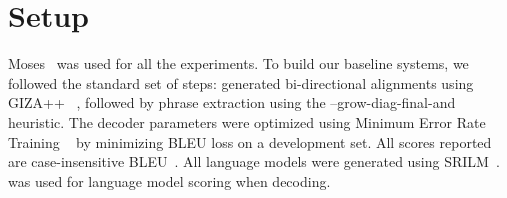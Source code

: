 \section{Setup}
\label{sec:setup}


Moses~\cite{Koehn:07} was used for all the experiments. To build our baseline systems, we followed the standard set of steps: generated bi-directional alignments using GIZA++ ~\cite{OchNey:03}, followed by phrase extraction using the --grow-diag-final-and heuristic. The decoder parameters were optimized using Minimum Error Rate Training ~\cite{Och:03} by minimizing BLEU loss on a development set. All scores reported are case-insensitive BLEU~\cite{Papineni:02}. All language models were generated using SRILM~\cite{Stolcke:02}.~\cite{Ken:11} was used for language model scoring when decoding.